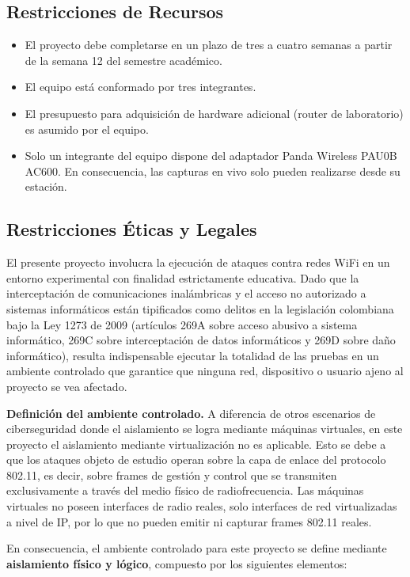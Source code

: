 \documentclass[11pt,a4paper]{article}
\begin{document}
\subsection{Restricciones de Recursos}
\begin{itemize}
  \item El proyecto debe completarse en un plazo de tres a cuatro semanas a
    partir de la semana 12 del semestre académico.
  \item El equipo está conformado por tres integrantes.
  \item El presupuesto para adquisición de hardware adicional (router de
    laboratorio) es asumido por el equipo.
  \item Solo un integrante del equipo dispone del adaptador Panda Wireless
    PAU0B AC600. En consecuencia, las capturas en vivo solo pueden realizarse
    desde su estación.
\end{itemize}

\subsection{Restricciones Éticas y Legales}
El presente proyecto involucra la ejecución de ataques contra redes WiFi en
un entorno experimental con finalidad estrictamente educativa. Dado que la
interceptación de comunicaciones inalámbricas y el acceso no autorizado a
sistemas informáticos están tipificados como delitos en la legislación
colombiana bajo la Ley 1273 de 2009 (artículos 269A sobre acceso abusivo a
sistema informático, 269C sobre interceptación de datos informáticos y 269D
sobre daño informático), resulta indispensable ejecutar la totalidad de las
pruebas en un ambiente controlado que garantice que ninguna red, dispositivo
o usuario ajeno al proyecto se vea afectado.

\textbf{Definición del ambiente controlado.} A diferencia de otros escenarios
de ciberseguridad donde el aislamiento se logra mediante máquinas virtuales,
en este proyecto el aislamiento mediante virtualización no es aplicable. Esto
se debe a que los ataques objeto de estudio operan sobre la capa de enlace
del protocolo 802.11, es decir, sobre frames de gestión y control que se
transmiten exclusivamente a través del medio físico de radiofrecuencia. Las
máquinas virtuales no poseen interfaces de radio reales, solo interfaces de
red virtualizadas a nivel de IP, por lo que no pueden emitir ni capturar
frames 802.11 reales.

En consecuencia, el ambiente controlado para este proyecto se define
mediante \textbf{aislamiento físico y lógico}, compuesto por los siguientes
elementos:
\end{document}
